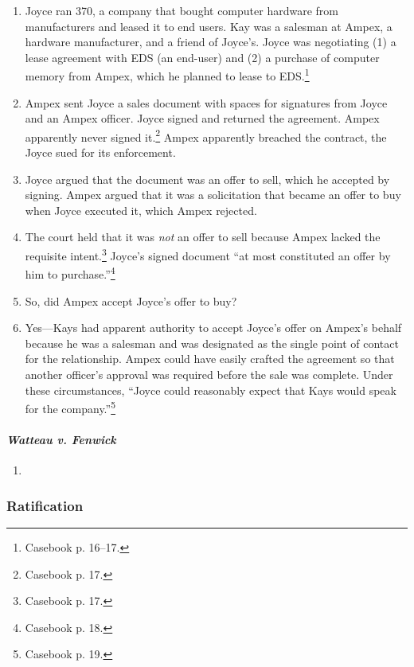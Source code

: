 \begin{enumerate}
    \item Joyce ran 370, a company that bought computer hardware from 
    manufacturers and leased it to end users. Kay was a salesman at Ampex, a 
    hardware manufacturer, and a friend of Joyce's. Joyce was negotiating (1) 
    a lease agreement with EDS (an end-user) and (2) a purchase of computer 
    memory from Ampex, which he planned to lease to EDS.\footnote{Casebook p. 
    16--17.}
    \item Ampex sent Joyce a sales document with spaces for signatures from 
    Joyce and an Ampex officer. Joyce signed and returned the agreement. Ampex 
    apparently never signed it.\footnote{Casebook p. 17.} Ampex apparently 
    breached the contract, the Joyce sued for its enforcement.
    \item Joyce argued that the document was an offer to sell, which he 
    accepted by signing. Ampex argued that it was a solicitation that became 
    an offer to buy when Joyce executed it, which Ampex rejected.
    \item The court held that it was \emph{not} an offer to sell because Ampex 
    lacked the requisite intent.\footnote{Casebook p. 17.} Joyce's signed 
    document ``at most constituted an offer by him to 
    purchase.''\footnote{Casebook p. 18.}
    \item So, did Ampex accept Joyce's offer to buy?
    \item Yes---Kays had apparent authority to accept Joyce's offer on Ampex's 
    behalf because he was a salesman and was designated as the single point of 
    contact for the relationship. Ampex could have easily crafted the 
    agreement so that another officer's approval was required before the sale 
    was complete. Under these circumstances, ``Joyce could reasonably expect 
    that Kays would speak for the company.''\footnote{Casebook p. 19.}
\end{enumerate}

\newpage %

\paragraph{\emph{Watteau v. Fenwick}}

\begin{enumerate}
    \item %
\end{enumerate}

\subsubsection{Ratification}

